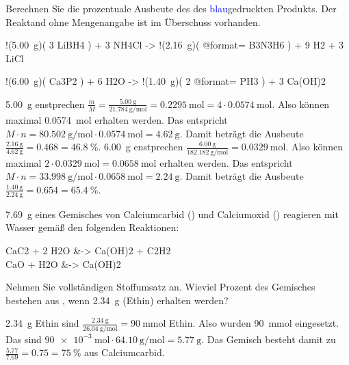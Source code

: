 \documentclass[DIV11,bib=totoc]{scrartcl}
\begin{document}
\begin{question}
Berechnen Sie die prozentuale Ausbeute des des \textcolor{blue}{blau}gedruckten
Produkts.  Der Reaktand ohne Mengenangabe ist im Überschuss vorhanden.
\begin{tasks}
 \task
   \begin{reaction*}
     !(\SI{5.00}{\gram})( 3 LiBH4 ) + 3 NH4Cl ->
       !(\SI{2.16}{\gram})( @{format=\color{blue}} B3N3H6 ) + 9 H2 + 3 LiCl
    \end{reaction*}
 \task
   \begin{reaction*}
     !(\SI{6.00}{\gram})( Ca3P2 ) + 6 H2O ->
       !(\SI{1.40}{\gram})( 2 @{format=\color{blue}} PH3 ) + 3 Ca(OH)2
    \end{reaction*}
\end{tasks}
\end{question}
\begin{solution}
\begin{tasks}
  \task \SI{5.00}{\gram}  enstprechen $\frac{m}{M} =
    \frac{\SI{5.00}{\gram}}{\SI{21.784}{\gram\per\mole}} = \SI{0.2295}{\mole} =
    4\cdot\SI{0.0574}{\mole}$.  Also können maximal \SI{0.0574}{\mole}
     erhalten werden.  Das entspricht $M\cdot n =
    \SI{80.502}{\gram\per\mole}\cdot\SI{0.0574}{\mole} = \SI{4.62}{\gram}$.
    Damit beträgt die Ausbeute $\frac{\SI{2.16}{\gram}}{\SI{4.62}{\gram}} =
    \num{0.468} = \SI{46.8}{\percent}$.
  \task \SI{6.00}{\gram}  enstprechen
    $\frac{\SI{6.00}{\gram}}{\SI{182.182}{\gram\per\mole}} =
    \SI{0.0329}{\mole}$.  Also können maximal $2\cdot\SI{0.0329}{\mole} =
    \SI{0.0658}{\mole}$  erhalten werden.  Das entspricht $M\cdot n =
    \SI{33.998}{\gram\per\mole}\cdot\SI{0.0658}{\mole} = \SI{2.24}{\gram}$.
    Damit beträgt die Ausbeute $\frac{\SI{1.40}{\gram}}{\SI{2.24}{\gram}} =
    \num{0.654} = \SI{65.4}{\percent}$.
\end{tasks}
\end{solution}

\begin{question}
\SI{7.69}{\gram} eines Gemisches von Calciumcarbid () und Calciumoxid
() reagieren mit Wasser gemäß den folgenden Reaktionen:
\begin{reactions*}
  CaC2\sld{} + 2 H2O\lqd{} &-> Ca(OH)2\aq{} + C2H2\gas{} \\
  CaO\sld{} + H2O\lqd{} &-> Ca(OH)2\aq{}
\end{reactions*}
Nehmen Sie vollständigen Stoffumsatz an. Wieviel Prozent des Gemisches
bestehen aus , wenn \SI{2.34}{\gram}  (Ethin) erhalten
werden?
\end{question}
\begin{solution}
\SI{2.34}{\gram} Ethin sind
$\frac{\SI{2.34}{\gram}}{\SI{26.04}{\gram\per\mole}} = \SI{90}{\milli\mole}$
Ethin.  Also wurden \SI{90}{\milli\mole}  eingesetzt.  Das sind
$\SI{90e-3}{\mole}\cdot\SI{64.10}{\gram\per\mole} = \SI{5.77}{\gram}$.  Das
Gemisch besteht damit zu $\frac{5.77}{7.69}=0.75=\SI{75}{\percent}$ aus
Calciumcarbid.
\end{solution}
\end{document}
